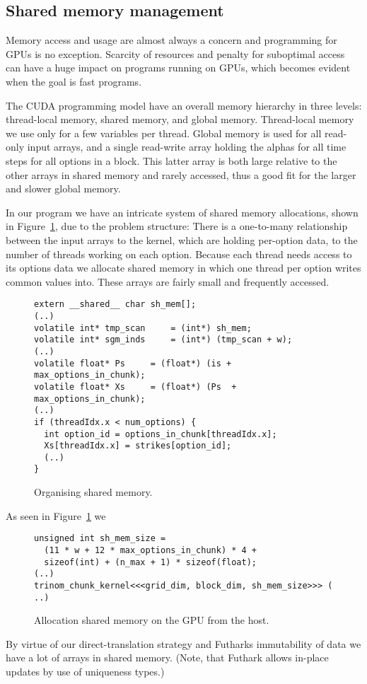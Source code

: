 \subsection{Shared memory management}

Memory access and usage are almost always a concern and
programming for GPUs is no exception. Scarcity of resources
and penalty for suboptimal access can have a huge impact on
programs running on GPUs, which becomes evident when the
goal is fast programs.

The CUDA programming model have an overall memory hierarchy
in three levels: thread-local memory, shared memory, and
global memory. Thread-local memory we use only for a few
variables per thread. Global memory is used for all
read-only input arrays, and a single read-write array
holding the alphas for all time steps for all options in a
block. This latter array is both large relative to the other
arrays in shared memory and rarely accessed, thus a good fit
for the larger and slower global memory.

In our program we have an intricate system of shared memory
allocations, shown in Figure~\ref{fig:shmem}, due to the
problem structure: There is a one-to-many relationship
between the input arrays to the kernel, which are holding
per-option data, to the number of threads working on each
option. Because each thread needs access to its options data
we allocate shared memory in which one thread per option
writes common values into. These arrays are fairly small and
frequently accessed.
%
\begin{figure}[bt]
\begin{center}
\begin{lstlisting}
extern __shared__ char sh_mem[];
(..)
volatile int* tmp_scan     = (int*) sh_mem;
volatile int* sgm_inds     = (int*) (tmp_scan + w);
(..)
volatile float* Ps     = (float*) (is + max_options_in_chunk);
volatile float* Xs     = (float*) (Ps  + max_options_in_chunk);
(..)
if (threadIdx.x < num_options) {
  int option_id = options_in_chunk[threadIdx.x];
  Xs[threadIdx.x] = strikes[option_id];
  (..)
}
\end{lstlisting}
\caption{Organising shared memory.}
\label{fig:shmem}
\end{center}
\end{figure}
%
As seen in Figure~\ref{fig:shmem} we 

%
\begin{figure}[bt]
\begin{center}
\begin{lstlisting}
unsigned int sh_mem_size =
  (11 * w + 12 * max_options_in_chunk) * 4 +
  sizeof(int) + (n_max + 1) * sizeof(float);
(..)
trinom_chunk_kernel<<<grid_dim, block_dim, sh_mem_size>>> ( ..)
\end{lstlisting}
\end{center}
\caption{Allocation shared memory on the GPU from the host.}
\label{fig:allocshmem}
\end{figure}
%
By virtue of our direct-translation strategy and Futharks
immutability of data we have a lot of arrays in shared
memory. (Note, that Futhark allows in-place updates by use
of uniqueness types.) 

